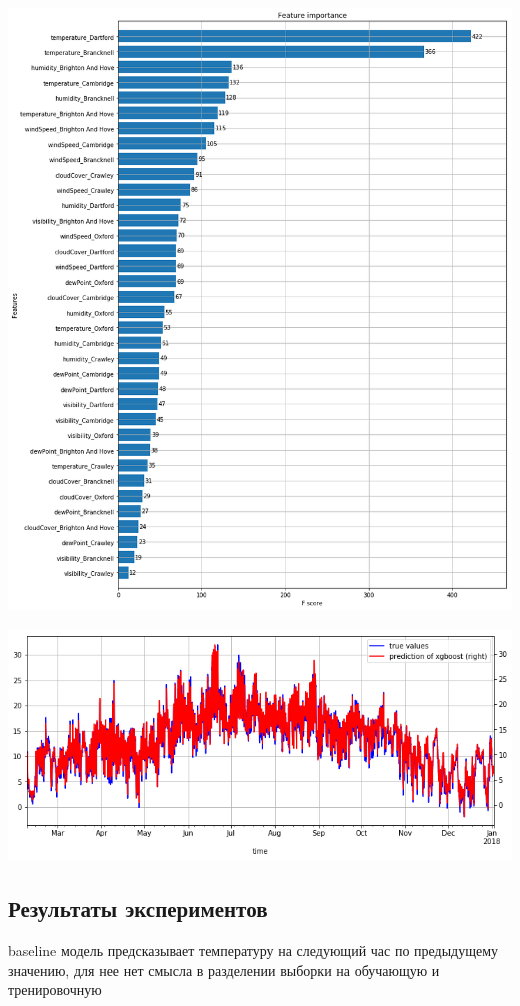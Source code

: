 \documentclass[11pt]{article}
\begin{document}
\begin{center}
\includegraphics[width=15cm]{./pics/xgboost_feature_importance_6_cities.png}
\end{center}


\begin{center}
\includegraphics[width=15cm]{./pics/xgboost_predictions_3_cities.png}
\end{center}

\subsection{Результаты экспериментов}
\label{sec:org3b8cbde}
baseline модель предсказывает температуру на следующий час по предыдущему значению, для нее нет смысла в разделении
выборки на обучающую и тренировочную
\end{document}
